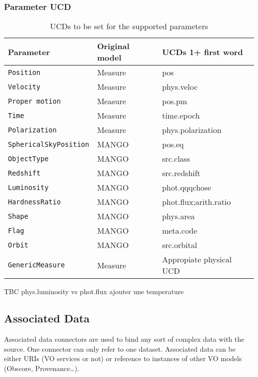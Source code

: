 \documentclass[11pt,a4paper]{ivoa}
\begin{document}
\subsubsection{Parameter UCD}

\begin{table}[ht!]
     \begin{tabular}{|p{4cm}|p{3cm}|p{3.5cm}|}
       \hline Parameter &  Original model & UCDs 1+ first word  \\
       \hline  \texttt{Position}             &  Measure  &  pos \\
       \hline  \texttt{Velocity  }            &  Measure & phys.veloc      \\
       \hline  \texttt{Proper motion}    & Measure & pos.pm    \\
       \hline  \texttt{Time}                   & Measure &  time.epoch   \\
       \hline  \texttt{Polarization}         & Measure & phys.polarization \\
       \hline  \texttt{SphericalSkyPosition}    &  MANGO  &  pos.eq \\
       \hline  \texttt{ObjectType}                   &  MANGO  & src.class \\
       \hline  \texttt{Redshift}                        &  MANGO  & src.redshift \\
       \hline  \texttt{Luminosity}                    &  MANGO  & phot.qqqchose \\
       \hline  \texttt{HardnessRatio}             &  MANGO  & phot.flux;arith.ratio \\
       \hline  \texttt{Shape}                     &  MANGO  & phys.area \\
       \hline  \texttt{Flag}                        &  MANGO  & meta.code  \\
       \hline  \texttt{Orbit}                       &  MANGO  & src.orbital \\
       \hline  \texttt{GenericMeasure}    &  Measure  &  Appropiate physical UCD \\
       \hline
     \end{tabular}
     \caption{ UCDs to be set for the supported parameters}
     \label{tab:ucds}
 \end{table}

TBC phys.luminosity  vs phot.flux
ajouter une temperature

\subsection{Associated Data}
Associated data connectors are used to bind any sort of complex data with the source. One connector can only refer to one dataset. Associated data can be either URIs (VO services or not) or reference to instances of other VO models (Obscore, Provenance…).
\end{document}
